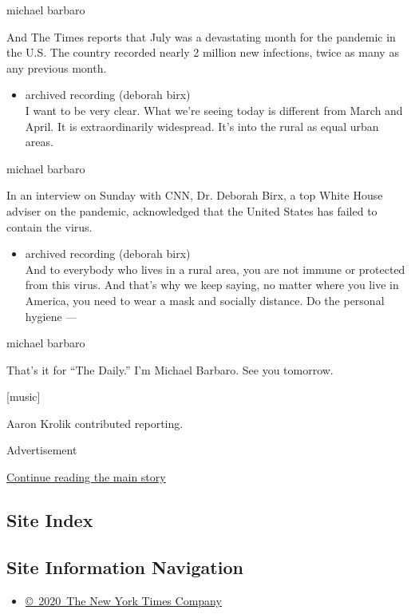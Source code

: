 michael barbaro

And The Times reports that July was a devastating month for the pandemic
in the U.S. The country recorded nearly 2 million new infections, twice
as many as any previous month.

\begin{itemize}
\tightlist
\item
  archived recording (deborah birx)\\
  I want to be very clear. What we're seeing today is different from
  March and April. It is extraordinarily widespread. It's into the rural
  as equal urban areas.
\end{itemize}

michael barbaro

In an interview on Sunday with CNN, Dr. Deborah Birx, a top White House
adviser on the pandemic, acknowledged that the United States has failed
to contain the virus.

\begin{itemize}
\tightlist
\item
  archived recording (deborah birx)\\
  And to everybody who lives in a rural area, you are not immune or
  protected from this virus. And that's why we keep saying, no matter
  where you live in America, you need to wear a mask and socially
  distance. Do the personal hygiene ---
\end{itemize}

michael barbaro

That's it for ``The Daily.'' I'm Michael Barbaro. See you tomorrow.

{[}music{]}

Aaron Krolik contributed reporting.

Advertisement

\protect\hyperlink{after-bottom}{Continue reading the main story}

\hypertarget{site-index}{%
\subsection{Site Index}\label{site-index}}

\hypertarget{site-information-navigation}{%
\subsection{Site Information
Navigation}\label{site-information-navigation}}

\begin{itemize}
\tightlist
\item
  \href{https://help.nytimes3xbfgragh.onion/hc/en-us/articles/115014792127-Copyright-notice}{©~2020~The
  New York Times Company}
\end{itemize}

